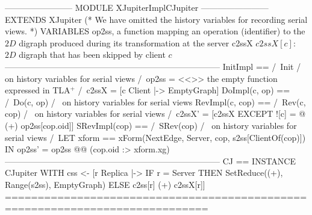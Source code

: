 \documentclass[preview, border={5pt 0pt 5pt 1pt}]{standalone}
\begin{document}
\begin{tla}
------------------------ MODULE XJupiterImplCJupiter ------------------------
EXTENDS XJupiter
(* We have omitted the history variables for recording serial views. *) 
VARIABLES op2ss, \* a function mapping an operation (identifier)
                 \* to the $2D$ digraph produced during its transformation at the server
          c2ssX  \* $c2ssX[c]$: $2D$ digraph that has been skipped by client $c$
-----------------------------------------------------------------------------
InitImpl == /\ Init 
            /\ \* on history variables for serial views
            /\ op2ss = <<>> \* the empty function expressed in TLA$^{+}$
            /\ c2ssX = [c \in Client |-> EmptyGraph]
DoImpl(c, op) == /\ Do(c, op)
                 /\ \* on history variables for serial views
RevImpl(c, cop) == /\ Rev(c, cop) 
                   /\ \* on history variables for serial views
                   /\ c2ssX' = [c2ssX EXCEPT ![c] = @ (+) op2ss[cop.oid]] 
SRevImpl(cop) == /\ SRev(cop) 
                 /\ \* on history variables for serial views
                 /\ LET xform == xForm(NextEdge, Server, cop, 
                                       s2ss[ClientOf(cop)])
                    IN op2ss' = op2ss @@ (cop.oid :> xform.xg)
-----------------------------------------------------------------------------
CJ == INSTANCE CJupiter WITH css <- [r \in Replica |->
              IF r = Server THEN SetReduce((+), Range(s2ss), EmptyGraph)
                            ELSE c2ss[r] (+) c2ssX[r]]
=============================================================================
\end{tla}
\end{document}
